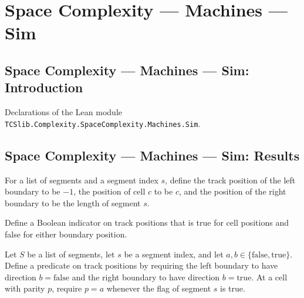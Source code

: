 \section{Space Complexity --- Machines --- Sim}
\subsection*{Space Complexity --- Machines --- Sim: Introduction}

Declarations of the Lean module \texttt{TCSlib.Complexity.SpaceComplexity.Machines.Sim}.

\subsection*{Space Complexity --- Machines --- Sim: Results}

\begin{definition}
\label{Complexity.LogProg.trackPos}
\leanok
{}
For a list of segments and a segment index $s$, define the track position of the left
boundary to be $-1$, the position of cell $c$ to be $c$, and the position of the right
boundary to be the length of segment $s$.
\end{definition}

\begin{definition}
\label{Complexity.LogProg.TPos.isCell}
\leanok
{}
Define a Boolean indicator on track positions that is true for cell positions and false
for either boundary position.
\end{definition}

\begin{definition}
\label{Complexity.LogProg.Consistent}
\leanok
{}
Let $S$ be a list of segments, let $s$ be a segment index, and let
$a,b\in\{\mathrm{false},\mathrm{true}\}$. Define a predicate on track positions by
requiring the left boundary to have direction $b=\mathrm{false}$ and the right boundary
to have direction $b=\mathrm{true}$. At a cell with parity $p$, require $p=a$ whenever
the flag of segment $s$ is true.
\end{definition}


